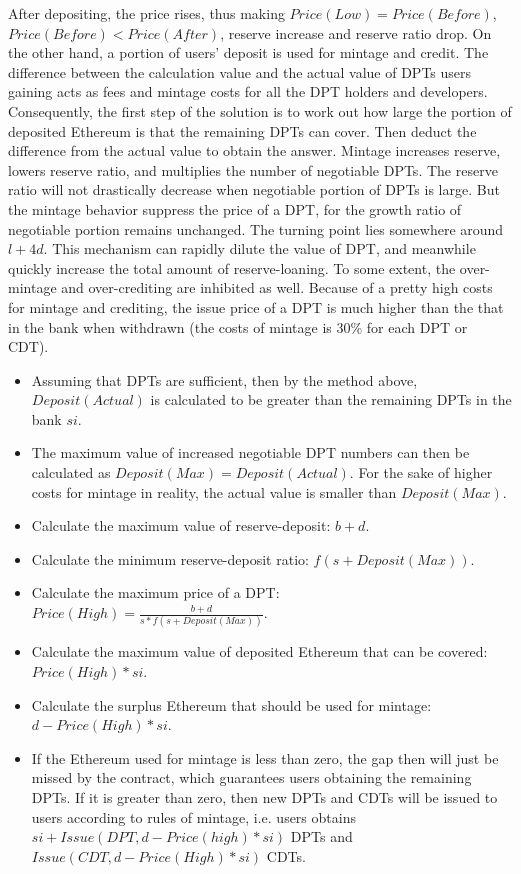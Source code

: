 \documentclass[a4paper, 10pt, conference]{ieeeconf} %
\begin{document}
After depositing, the price rises, thus making ${Price(Low) = Price(Before)}$, ${Price(Before) < Price(After)}$, reserve increase and reserve ratio drop.
On the other hand, a portion of users' deposit is used for mintage and credit. The difference between the calculation value and the actual value of DPTs users gaining acts as fees and mintage costs for all the DPT holders and developers. Consequently, the first step of the solution is to work out how large the portion of deposited Ethereum is that the remaining DPTs can cover. Then deduct the difference from the actual value to obtain the answer. Mintage increases reserve, lowers reserve ratio, and multiplies the number of negotiable DPTs. The reserve ratio will not drastically decrease when negotiable portion of DPTs is large. But the mintage behavior suppress the price of a DPT, for the growth ratio of negotiable portion remains unchanged. The turning point lies somewhere around ${l + 4d}$. This mechanism can rapidly dilute the value of DPT, and meanwhile quickly increase the total amount of reserve-loaning. To some extent, the over-mintage and over-crediting are inhibited as well. Because of a pretty high costs for mintage and crediting, the issue price of a DPT is much higher than the that in the bank when withdrawn (the costs of mintage is 30\% for each DPT or CDT).


\begin{itemize}
   \item Assuming that DPTs are sufficient, then by the method above, ${Deposit(Actual)}$ is calculated to be greater than the remaining DPTs in the bank ${si}$.
   \item The maximum value of increased negotiable DPT numbers can then be calculated as ${Deposit(Max) = Deposit(Actual)}$. For the sake of higher costs for mintage in reality, the actual value is smaller than ${Deposit(Max)}$.
   \item Calculate the maximum value of reserve-deposit: ${b + d}$.
   \item Calculate the minimum reserve-deposit ratio: ${f(s + Deposit(Max))}$.
   \item Calculate the maximum price of a DPT: ${Price(High) = \frac{b + d}{s * f(s + Deposit(Max))}}$.
   \item Calculate the maximum value of deposited Ethereum that can be covered: ${Price(High) * si}$.
   \item Calculate the surplus Ethereum that should be used for mintage: ${d - Price(High) * si}$.
   \item If the Ethereum used for mintage is less than zero, the gap then will just be missed by the contract, which guarantees users obtaining the remaining DPTs. If it is greater than zero, then new DPTs and CDTs will be issued to users according to rules of mintage, i.e. users obtains  ${si + Issue(DPT, d - Price(high) * si)}$ DPTs and ${Issue(CDT, d - Price(High) * si)}$ CDTs.
\end{itemize}
\end{document}
